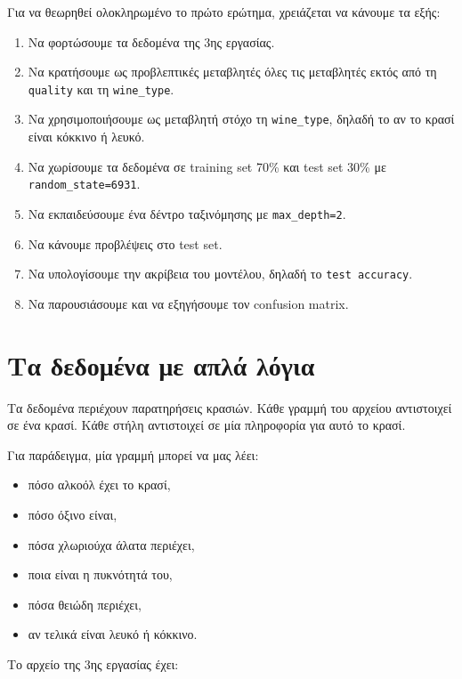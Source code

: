 \documentclass[12pt,a4paper]{article}
\newcommand{\code}[1]{\texttt{\textenglish{#1}}}
\begin{document}
Για να θεωρηθεί ολοκληρωμένο το πρώτο ερώτημα, χρειάζεται να κάνουμε τα εξής:

\begin{enumerate}[label=\arabic*.]
    \item Να φορτώσουμε τα δεδομένα της 3ης εργασίας.
    \item Να κρατήσουμε ως προβλεπτικές μεταβλητές όλες τις μεταβλητές εκτός
    από τη \code{quality} και τη \code{wine\_type}.
    \item Να χρησιμοποιήσουμε ως μεταβλητή στόχο τη \code{wine\_type}, δηλαδή
    το αν το κρασί είναι κόκκινο ή λευκό.
    \item Να χωρίσουμε τα δεδομένα σε training set 70\% και test set 30\% με
    \code{random\_state=6931}.
    \item Να εκπαιδεύσουμε ένα δέντρο ταξινόμησης με
    \code{max\_depth=2}.
    \item Να κάνουμε προβλέψεις στο test set.
    \item Να υπολογίσουμε την ακρίβεια του μοντέλου, δηλαδή το
    \code{test accuracy}.
    \item Να παρουσιάσουμε και να εξηγήσουμε τον confusion matrix.
\end{enumerate}

\section{Τα δεδομένα με απλά λόγια}

Τα δεδομένα περιέχουν παρατηρήσεις κρασιών. Κάθε γραμμή του αρχείου αντιστοιχεί
σε ένα κρασί. Κάθε στήλη αντιστοιχεί σε μία πληροφορία για αυτό το κρασί.

Για παράδειγμα, μία γραμμή μπορεί να μας λέει:

\begin{itemize}[nosep]
    \item πόσο αλκοόλ έχει το κρασί,
    \item πόσο όξινο είναι,
    \item πόσα χλωριούχα άλατα περιέχει,
    \item ποια είναι η πυκνότητά του,
    \item πόσα θειώδη περιέχει,
    \item αν τελικά είναι λευκό ή κόκκινο.
\end{itemize}

Το αρχείο της 3ης εργασίας έχει:
\end{document}
